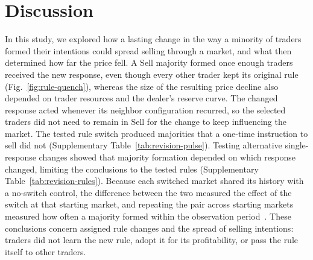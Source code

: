 \section{Discussion}

In this study, we explored how a lasting change in the way a minority
of traders formed their intentions could spread selling through a market,
and what then determined how far the price fell. A Sell majority formed
once enough traders received the new response, even though every other trader kept its
original rule (Fig.~\ref{fig:rule-quench}), whereas the size of the
resulting price decline also depended on trader resources and the
dealer's reserve curve. The changed
response acted whenever its neighbor configuration recurred, so the
selected traders did not need to remain in Sell for the change to keep
influencing the market. The tested rule switch produced majorities that a one-time
instruction to sell did not (Supplementary
Table~\ref{tab:revision-pulse}). Testing alternative single-response changes showed that majority
formation depended on which response changed, limiting the conclusions
to the tested rules
(Supplementary Table~\ref{tab:revision-rules}). Because each switched
market shared its history with a no-switch control, the difference
between the two measured the effect of the switch at that starting
market, and repeating the pair across starting markets measured how
often a majority formed within the observation
period~\cite{glasserman1992guidelines,law2015simulation}. These
conclusions concern assigned rule changes and the spread of selling intentions:
traders did not learn the new rule, adopt it for its profitability, or
pass the rule itself to other traders.

